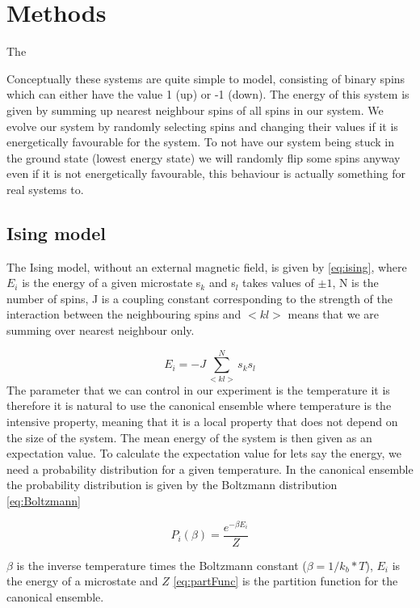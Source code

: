 \section{Methods}

The

Conceptually these systems are quite simple to model,
consisting of binary spins which can either have the value 1 (up) or -1 (down).
The energy of this system is given by summing up nearest neighbour spins of all
spins in our system. We evolve our system by randomly selecting spins and
changing their values if it is energetically favourable for the system. To not
have our system being stuck in the ground state (lowest energy state) we will randomly flip some spins
anyway even if it is not energetically favourable, this behaviour is actually
something for real systems to.
\subsection{Ising model}
The Ising model, without an external magnetic field, is given by
\cref{eq:ising}, where $E_i$ is the energy of a given microstate s$_k$ and s$_l$ takes values of $\pm 1$, N is the
number of spins, J is a coupling constant corresponding to the strength of the
interaction between the neighbouring spins and $<kl>$ means that we are summing over
nearest neighbour only.

\begin{equation}
  \label{eq:ising}
  E_i = -J\sum_{<kl>}^{N} s_k s_l
\end{equation}
The parameter that we can control in our experiment is the temperature it is
therefore it is natural to
use the canonical ensemble where temperature is the intensive property, meaning
that it is a local property that does not depend on the size of the system. The
mean energy of the system is then given as an expectation value. To calculate
the expectation value for lets say the energy, we need a probability distribution
for a given temperature. In the canonical ensemble the probability distribution
is given by the Boltzmann distribution \cref{eq:Boltzmann}

\begin{equation}\label{eq:Boltzmann}
  P_i(\beta) = \frac{e^{-\beta E_i}}{Z}
\end{equation}

$\beta$ is the inverse temperature times the Boltzmann constant
($\beta = 1/k_b*T $),  $E_i$ is the energy of a microstate and $Z$
\cref{eq:partFunc} is the partition function for the canonical ensemble.

